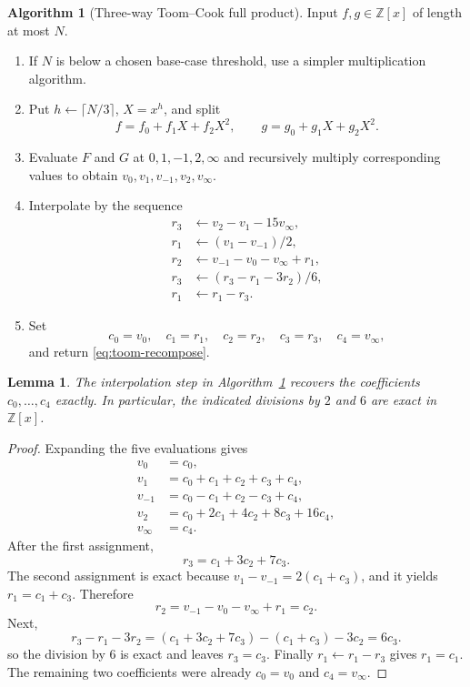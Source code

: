 \documentclass[11pt]{book}
\newtheorem{lemma}[theorem]{Lemma}
\theoremstyle{definition}
\newtheorem{algorithm}[theorem]{Algorithm}
\newcommand{\ZZ}{\mathbb Z}
\begin{document}
\begin{algorithm}[Three-way Toom--Cook full product]\label{alg:toom3-product}
Input $f,g\in\ZZ[x]$ of length at most $N$.
\begin{enumerate}
 \item If $N$ is below a chosen base-case threshold, use a simpler
 multiplication algorithm.
 \item Put $h\leftarrow\lceil N/3\rceil$, $X=x^h$, and split
 \[
   f=f_0+f_1X+f_2X^2,\qquad
   g=g_0+g_1X+g_2X^2.
 \]
 \item Evaluate $F$ and $G$ at $0,1,-1,2,\infty$ and recursively multiply
 corresponding values to obtain
 $v_0,v_1,v_{-1},v_2,v_\infty$.
 \item Interpolate by the sequence
 \begin{align*}
   r_3 &\leftarrow v_2-v_1-15v_\infty,\\
   r_1 &\leftarrow (v_1-v_{-1})/2,\\
   r_2 &\leftarrow v_{-1}-v_0-v_\infty+r_1,\\
   r_3 &\leftarrow (r_3-r_1-3r_2)/6,\\
   r_1 &\leftarrow r_1-r_3.
 \end{align*}
 \item Set
 \[
    c_0=v_0,\quad c_1=r_1,\quad c_2=r_2,
    \quad c_3=r_3,\quad c_4=v_\infty,
 \]
 and return \eqref{eq:toom-recompose}.
\end{enumerate}
\end{algorithm}

\begin{lemma}\label{lem:toom3-interpolation}
The interpolation step in Algorithm~\ref{alg:toom3-product} recovers the
coefficients $c_0,\ldots,c_4$ exactly.  In particular, the indicated divisions
by $2$ and $6$ are exact in $\ZZ[x]$.
\end{lemma}

\begin{proof}
Expanding the five evaluations gives
\begin{align*}
 v_0&=c_0,\\
 v_1&=c_0+c_1+c_2+c_3+c_4,\\
 v_{-1}&=c_0-c_1+c_2-c_3+c_4,\\
 v_2&=c_0+2c_1+4c_2+8c_3+16c_4,\\
 v_\infty&=c_4.
\end{align*}
After the first assignment,
\[
 r_3=c_1+3c_2+7c_3.
\]
The second assignment is exact because
$v_1-v_{-1}=2(c_1+c_3)$, and it yields
$r_1=c_1+c_3$.  Therefore
\[
 r_2=v_{-1}-v_0-v_\infty+r_1=c_2.
\]
Next,
\[
 r_3-r_1-3r_2
 =(c_1+3c_2+7c_3)-(c_1+c_3)-3c_2=6c_3.
\]
so the division by $6$ is exact and leaves $r_3=c_3$.  Finally
$r_1\leftarrow r_1-r_3$ gives $r_1=c_1$.  The remaining two coefficients were
already $c_0=v_0$ and $c_4=v_\infty$.
\end{proof}
\end{document}
